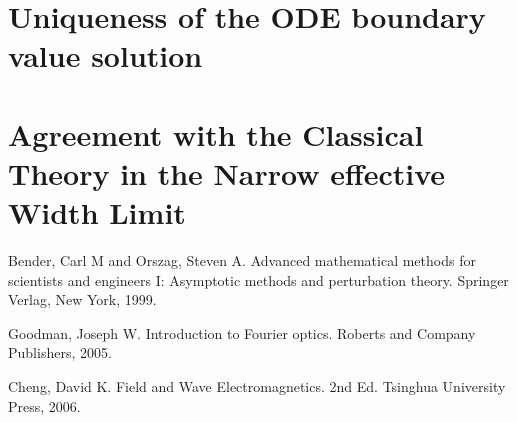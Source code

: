 \documentclass[twocolumn,secnumarabic,amssymb, nobibnotes, aps, prd]{revtex4-1}
\begin{document}
\section{Uniqueness of the ODE boundary value solution}


\section{Agreement with the Classical Theory in the Narrow effective Width Limit}


%

\begin{thebibliography}{2d}

Bender, Carl M and Orszag, Steven A. Advanced mathematical methods for scientists and engineers I: Asymptotic methods and perturbation theory. Springer Verlag, New York, 1999.

Goodman, Joseph W. Introduction to Fourier optics. Roberts and Company Publishers, 2005.

Cheng, David K. Field and Wave Electromagnetics. 2nd Ed. Tsinghua University Press, 2006.



  


\end{thebibliography}


%	
%
%
%

%
%
%
\end{document}
